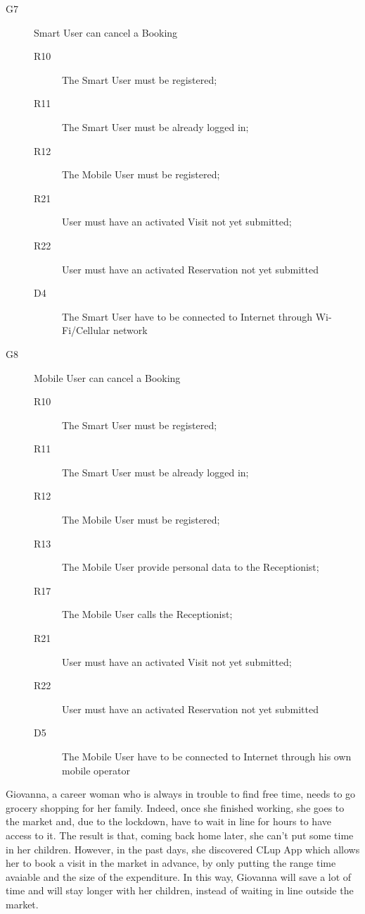 \begin{description}
    \item[G7]Smart User can cancel a Booking
    \begin{description}
    \item[R10] The Smart User must be registered;
    \item[R11] The Smart User must be already logged in;
    \item[R12] The Mobile User must be registered; %
    \item[R21] User must have an activated Visit not yet submitted;
    \item[R22] User must have an activated Reservation not yet submitted
    \item[D4] The Smart User have to be connected to Internet through Wi-Fi/Cellular network
    \end{description}
    
    \item[G8]Mobile User can cancel a Booking
    \begin{description}
    \item[R10] The Smart User must be registered;
    \item[R11] The Smart User must be already logged in;
    \item[R12] The Mobile User must be registered; %
    \item[R13] The Mobile User provide personal data to the Receptionist; %
    \item[R17] The Mobile User calls the Receptionist;
    \item[R21] User must have an activated Visit not yet submitted;
    \item[R22] User must have an activated Reservation not yet submitted
    \item[D5] The Mobile User have to be connected to Internet through his own mobile operator
    \end{description}
    
    
\end{description}

 

 
Giovanna, a career woman who is always in trouble to find free time, needs to go grocery shopping for her family. 
Indeed, once she finished working, she goes to the market and, due to the lockdown, have to wait in line for hours to have access to it. The result is that, coming back home later, she can't put some time in her children.
However, in the past days, she discovered CLup App which allows her to book a visit in the market in advance, by only putting the range time avaiable and the size of the expenditure.
In this way, Giovanna will save a lot of time and will stay longer with her children, instead of waiting in line outside the market.

